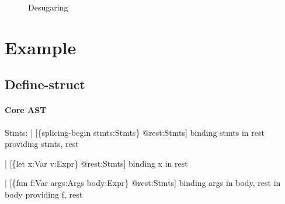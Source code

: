 \begin{figure}
  
  \caption{Desugaring}
  \label{fig:formal-expansion}
\end{figure}



\newpage
\section{Example}

\subsection{Define-struct}

\paragraph{Core AST}
\begin{Codes}
Stmts:
| [\{splicing-begin stmts:Stmts\} @rest:Stmts]
   binding stmts in rest
   providing stmts, rest

| [\{let x:Var v:Expr\} @rest:Stmts]
   binding x in rest

| [\{fun f:Var args:Args body:Expr\} @rest:Stmts]
   binding args in body, rest in body
   providing f, rest
\end{Codes}



